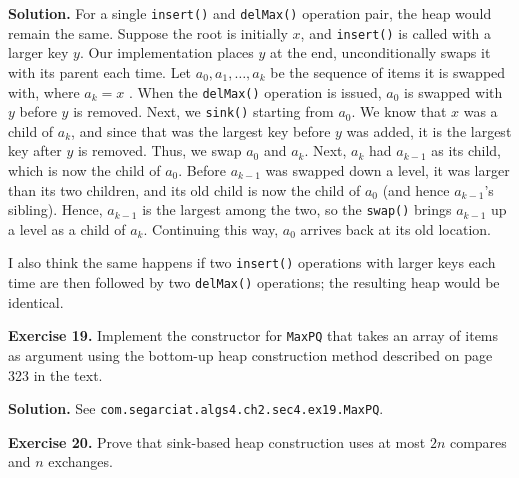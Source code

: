 \documentclass[12pt, a4paper]{article}
\newenvironment{ex}[2][Exercise]
{\par\medskip\noindent \textbf{#1 #2.}}
{\medskip}
\newenvironment{sol}[1][Solution]
{\par\medskip\noindent \textbf{#1.} }
{\medskip}
\begin{document}
	\begin{sol}
		For a single \texttt{insert()} and \texttt{delMax()} operation pair, the heap would remain
		the same. Suppose the root is initially $x$, and \texttt{insert()} is called
		with a larger key $y$. Our implementation places $y$ at the end,
		unconditionally swaps it with its parent each time. Let $a_0,a_1,\ldots,a_k$ be
		the sequence of items it is swapped with, where $a_k=x$ . When the \texttt{delMax()}
		operation is issued, $a_0$ is swapped with $y$ before $y$ is removed. Next,
		we \texttt{sink()} starting from $a_0$. We know that $x$ was a child of
		$a_k$, and since that was the largest key before $y$ was added, it is the
		largest key after $y$ is removed. Thus, we swap $a_0$ and $a_k$. Next, $a_k$
		had $a_{k-1}$ as its child, which is now the child of $a_0$. Before $a_{k-1}$
		was swapped down a level, it was larger than its two children, and its old child
		is now the child of $a_0$ (and hence $a_{k-1}$'s sibling). Hence, $a_{k-1}$
		is the largest among the two, so the \texttt{swap()} brings $a_{k-1}$ up a level
		as a child of $a_{k}$. Continuing this way, $a_0$ arrives back at its old location.
		
		I also think the same happens if two \texttt{insert()} operations with larger
		keys each time are then followed by two \texttt{delMax()} operations; the
		resulting heap would be identical.
	\end{sol}
	\begin{ex}{19}
		Implement the constructor for \texttt{MaxPQ} that takes an array of items as
		argument using the bottom-up heap construction method described on page 323
		in the text.
	\end{ex}
	\begin{sol}
		See \texttt{com.segarciat.algs4.ch2.sec4.ex19.MaxPQ}.
	\end{sol}
	\begin{ex}{20}
		Prove that sink-based heap construction uses at most $2n$ compares and $n$
		exchanges.
	\end{ex}
\end{document}

